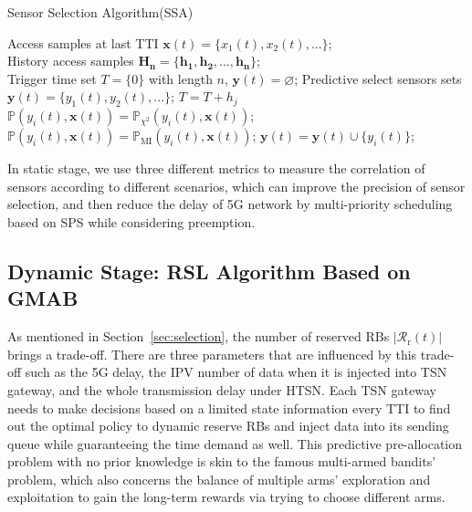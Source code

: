 \documentclass{SCIS2021}
\begin{document}
	\begin{algorithm}
		\renewcommand{\algorithmicrequire}{\textbf{Input:}}%
		\renewcommand{\algorithmicensure}{\textbf{Output:}}%
		\footnotesize
		\caption{Sensor Selection Algorithm(SSA)}
		\label{alg1}
		{\fontsize{10}{12}\selectfont
			\begin{algorithmic}[1]
				\REQUIRE Access samples at last TTI $\bm{x}(t)=\{x_{1}(t), x_{2}(t), ...\}$;\\ \qquad  History access samples $\bm{H_{n}} = \{\bm{h_{1}, h_{2}, ..., h_{n}}\}$;\\ \qquad Trigger time set $T = \{0\} $ with length $n$, $\bm{y}(t) = \varnothing$;
				\ENSURE Predictive select sensors sets $\bm{y}(t) = \{y_{1}(t), y_{2}(t), ...\}$;
				\STATE $T = T + h_{j}$
				\ENDWHILE
				\STATE $\mathbb{P}(y_{i}(t), \bm{x}(t)) = \mathbb{P}_{\chi^{2}}(y_{i}(t), \bm{x}(t))$;
				\STATE $\mathbb{P}(y_{i}(t), \bm{x}(t)) = \mathbb{P}_{\mathrm{MI}}(y_{i}(t), \bm{x}(t))$;
				\ENDIF
				\STATE $\bm{y}(t) = \bm{y}(t)\cup \lbrace y_{i}(t)\rbrace $;
				\ENDIF
				\ENDWHILE
			\end{algorithmic}
		}
	\end{algorithm}

	\par In static stage, we use three different metrics to measure the correlation of sensors according to different scenarios, which can improve the precision of sensor selection, and then reduce the delay of 5G network by multi-priority scheduling based on SPS while considering preemption.


	\subsection{Dynamic Stage: RSL Algorithm Based on GMAB}
	As mentioned in Section~\ref{sec:selection}, the number of reserved RBs $\left|\mathcal{R}_\mathrm{r}(t)\right|$ brings a trade-off. There are three parameters that are influenced by this trade-off such as the 5G delay, the IPV number of data when it is injected into TSN gateway, and the whole transmission delay under HTSN. Each TSN gateway needs to make decisions based on a limited state information every TTI to find out the optimal policy to dynamic reserve RBs and inject data into its sending queue while guaranteeing the time demand as well. This predictive pre-allocation problem with no prior knowledge is skin to the famous multi-armed bandits' problem\cite{li2018predictive,arora2011sequential,xu2017data}, which also concerns the balance of multiple arms' exploration and exploitation to gain the long-term rewards via trying to choose different arms.
\end{document}
